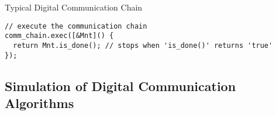 \begin{frame}{Typical Digital Communication Chain}
\begin{overprint}
\begin{verbatim}
// execute the communication chain
comm_chain.exec([&Mnt]() {
  return Mnt.is_done(); // stops when 'is_done()' returns 'true'
});
  \end{verbatim}
  \end{overprint}
\end{frame}

\subsection[Simulator]{Simulation of Digital Communication Algorithms}



